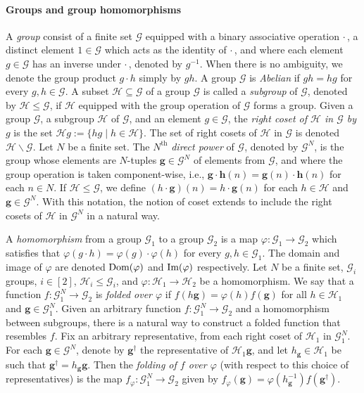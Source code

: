\documentclass[a4paper,11pt]{article}
\theoremstyle{definition}
\newcommand{\gr}{\mathscr{G}}
\newcommand{\sgr}{\mathscr{H}}
\newcommand{\bg}{\mathbf{g}}
\newcommand{\bh}{\mathbf{h}}
\newcommand{\im}{\textnormal{Im}}
\newcommand{\dom}{\textnormal{Dom}}
\newcommand{\groupid}{1}
\begin{document}
\paragraph{Groups and group homomorphisms} A \emph{group} consist of a finite set $\gr$ equipped with a binary associative operation $\cdot\,$, a distinct element $\groupid \in \gr$ which acts as the identity of $\cdot\,$, and where each element $g \in\gr$ has an inverse under $\cdot\,$, denoted by $g^{-1}$. When there is no ambiguity, we denote the group product $g\cdot h$ simply by $gh$.
A group $\gr$ is 
\emph{Abelian} if $gh=hg$ for every $g,h\in\gr$.
A subset $\sgr \subseteq \gr$ of a group $\gr$ is called a \emph{subgroup} of $\gr$, denoted by $\sgr \leq \gr$, if $\sgr$ equipped with the group operation of $\gr$ forms a group. 
Given a group $\gr$, a subgroup $\sgr$ of $\gr$, and an element $g \in\gr$, the \emph{right coset of $\sgr$ in $\gr$ by $g$} is the set $\sgr g :=\{h g \mid h \in \sgr\}$.
The set of right cosets of $\sgr$ in $\gr$ is denoted $\sgr \backslash \gr$.
Let $N$ be a finite set. The $N^{\text{th}}$ \emph{direct power} of $\gr$, denoted by $\gr^N$, is the group whose elements are $N$-tuples $\bg \in \gr^N$ of elements from $\gr$, and where the group operation is taken component-wise, i.e., $\bg \cdot \bh (n)= \bg(n) \cdot \bh(n)$ for each $n \in N$. If $\sgr \leq \gr$, we define $(h \cdot \bg)(n) = h \cdot \bg(n)$ for each $h \in \sgr$ and $\bg \in \gr^N$. With this notation, the notion of coset extends to include the right cosets of $\sgr$ in $\gr^N$ in a natural way. 

A \emph{homomorphism} from a group $\gr_1$ to a group $\gr_2$ is a map $\varphi:\gr_1 \to \gr_2$ which satisfies that $\varphi(g \cdot h)=\varphi(g)\cdot \varphi(h)$ for every $g,h\in\gr_1$.
The domain and image of $\varphi$ are denoted $\dom(\varphi)$ and $\im(\varphi)$ respectively.
Let $N$ be a finite set, $\gr_i$ groups, $i \in [2]$, $\sgr_i \leq \gr_i$, and $\varphi:\sgr_1\to\sgr_2$ be a homomorphism. We say that a function $f:\gr_1^N \to \gr_2$ is \emph{folded over $\varphi$} if
    $f(h\bg)=\varphi(h)f(\bg)$ for all $h\in \sgr_1$ and $\bg\in \gr_1^N$. Given an arbitrary function $f:\gr_1^N \to \gr_2$ and a homomorphism between subgroups, 
    there is a natural way to construct a folded function that resembles $f$. Fix an arbitrary representative, from each right coset of $\sgr_1$ in $\gr_1^N$. For each $\bg\in \gr^N$, denote by $\bg^\dagger$ the representative of $\sgr_1 \bg$, and let $h_\bg \in \sgr_1$ be such that 
    $\bg^\dagger = h_\bg \bg$. Then the \emph{folding of $f$ over $\varphi$} (with respect to this choice of representatives)
    is the map $f_\varphi: \gr_1^N \to \gr_2$
    given by $f_\varphi(\bg) = \varphi(h_\bg^{-1})f(\bg^\dagger)$.
\end{document}
